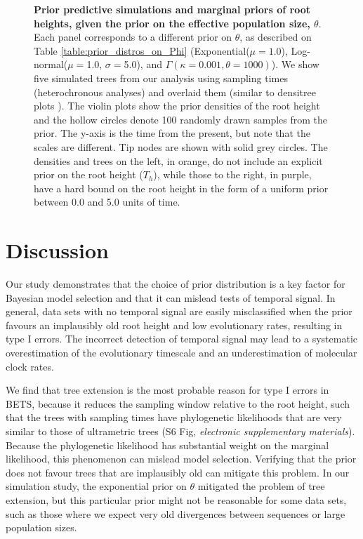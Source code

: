 \documentclass[10pt,letterpaper]{article}
\begin{document}
\begin{figure}[!h]
\begin{center}
		\caption{\textbf{Prior predictive simulations and marginal priors of root heights, given the prior on the effective population size, $\theta$}. Each panel corresponds to a different prior on $\theta$, as described on Table \ref{table:prior_distros_on_Phi} (Exponential($\mu=1.0$), Log-normal($\mu=$1.0, $\sigma=$5.0), and $\Gamma(\kappa=0.001, \theta=1000)$). We show five simulated trees from our analysis using sampling times (heterochronous analyses) and overlaid them (similar to densitree plots \cite{bouckaert2010densitree}). The violin plots show the prior densities of the root height and the hollow circles denote 100 randomly drawn samples from the prior. The y-axis is the time from the present, but note that the scales are different. Tip nodes are shown with solid grey circles. The densities and trees on the left, in orange, do not include an explicit prior on the root height ($T_h$), while those to the right, in purple, have a hard bound on the root height in the form of a uniform prior between 0.0 and 5.0 units of time.}
		\label{figure:prior_tree_distros}
	\end{center}
\end{figure}

\section*{Discussion}
Our study demonstrates that the choice of prior distribution is a key factor for Bayesian model selection and that it can mislead tests of temporal signal. In general, data sets with no temporal signal are easily misclassified when the prior favours an implausibly old root height and low evolutionary rates, resulting in type I errors. The incorrect detection of temporal signal may lead to a systematic overestimation of the evolutionary timescale and an underestimation of molecular clock rates.

{We find that tree extension is the most probable reason for type I errors in BETS, because it reduces the sampling window relative to the root height, such that the trees with sampling times have phylogenetic likelihoods that are very similar to those of ultrametric trees (S6 Fig, \textit{electronic supplementary materials}). Because the phylogenetic likelihood has substantial weight on the marginal likelihood, this phenomenon can mislead model selection. Verifying that the prior does not favour trees that are implausibly old can mitigate this problem. In our simulation study, the exponential prior on $\theta$ mitigated the problem of tree extension, but this particular prior might not be reasonable for some data sets, such as those where we expect very old divergences between sequences or large population sizes.}
\end{document}
